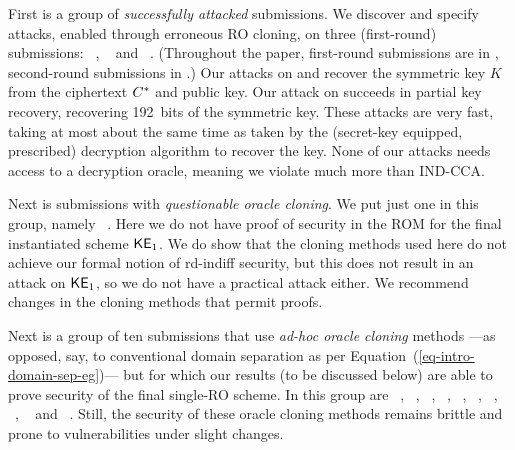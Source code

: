 First is a group of \textit{successfully attacked} submissions. We discover and specify attacks, enabled through erroneous RO cloning, on three (first-round) submissions:
~\cite{nistpqc:BIGQUAKE},
~\cite{nistpqc:DAGS} and
~\cite{nistpqc:Round2}.
(Throughout the paper, first-round submissions are in , second-round submissions in .)
Our attacks on  and  recover the symmetric key $K$ from the ciphertext $C^*$ and public key. Our attack on  succeeds in partial key recovery, recovering 192~bits of the symmetric key. These attacks are very fast, taking at most about the same time as taken by the (secret-key equipped, prescribed) decryption algorithm to recover the key. None of our attacks needs access to a decryption oracle, meaning we violate much more than IND-CCA. 

Next is submissions with \textit{questionable oracle cloning}. We put just one in this group, namely ~\cite{nistpqc:NewHope}.
Here we do not have proof of security in the ROM for the final instantiated scheme ${\mathsf{KE}}_{1}$. We do show that the cloning methods used here do not achieve our formal notion of rd-indiff security, but this does not result in an attack on ${\mathsf{KE}}_{1}$, so we do not have a practical attack either.
We recommend changes in the cloning methods that permit proofs.

Next is a group of ten submissions that use \textit{ad-hoc oracle cloning} methods ---as opposed, say, to conventional domain separation as per Equation~(\ref{eq-intro-domain-sep-eg})---  but for which our results (to be discussed below) are able to prove security of the final single-RO scheme.
In this group are
~\cite{nistpqc:BIKE},
~\cite{nistpqc:KCL},
~\cite{nistpqc:LAC},
~\cite{nistpqc:Lizard},
~\cite{nistpqc:LOCKER},
~\cite{nistpqc:OddM},
~\cite{nistpqc:ROLLO},
~\cite{nistpqc:Round5},
~\cite{nistpqc:SABER} and
~\cite{nistpqc:Titanium}.
Still, the security of these oracle cloning methods remains brittle and prone to vulnerabilities under slight changes.

